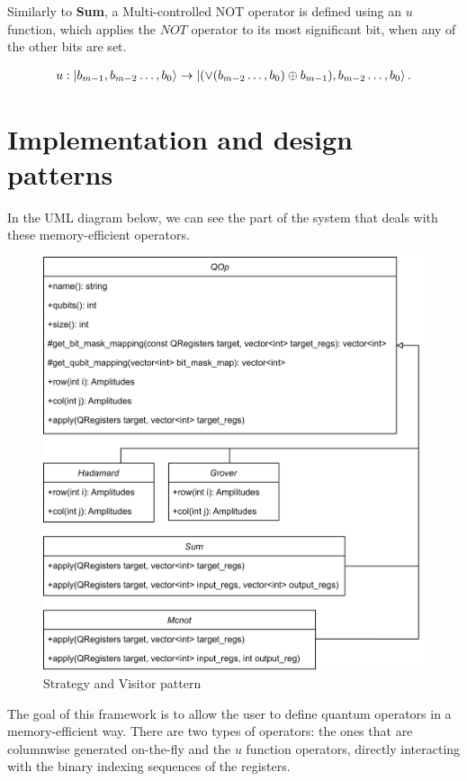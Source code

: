 Similarly to \textbf{Sum}, a Multi-controlled NOT operator is defined using an $u$ function, which applies the $NOT$ operator to its most significant bit, when any of the other bits are set.

\begin{align*}
    u: \ket{b_{m-1},b_{m-2}\dots{},b_0} \rightarrow \ket{(\vee(b_{m-2}\dots{},b_0) \oplus{} b_{m-1}),b_{m-2}\dots{},b_0}.
\end{align*}

\section{Implementation and design patterns}

In the UML diagram below, we can see the part of the system that deals with these memory-efficient operators.

\begin{figure}[H]
    \centering
    \includegraphics[width=\linewidth]{content/assets/04_simulator_implementation/uml.png}
    \caption{Strategy and Visitor pattern}
\end{figure}

The goal of this framework is to allow the user to define quantum operators in a memory-efficient way. There are two types of operators: the ones that are columnwise generated on-the-fly and the $u$ function operators, directly interacting with the binary indexing sequences of the registers.

